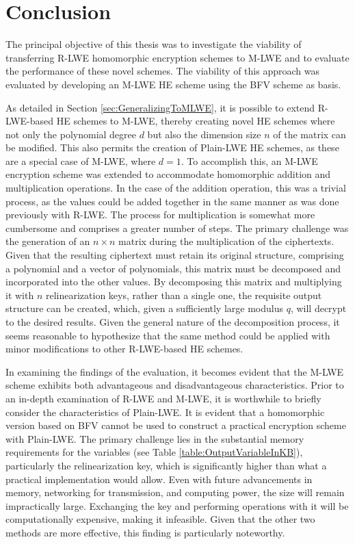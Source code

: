 \chapter{Conclusion}

The principal objective of this thesis was to investigate the viability of transferring R-LWE homomorphic encryption schemes to M-LWE and to evaluate the performance of these novel schemes. The viability of this approach was evaluated by developing an M-LWE HE scheme using the BFV scheme \cite{bfv} as basis.
 
As detailed in Section \ref{sec:GeneralizingToMLWE}, it is possible to extend R-LWE-based HE schemes to M-LWE, thereby creating novel HE schemes where not only the polynomial degree $d$ but also the dimension size $n$ of the matrix can be modified. This also permits the creation of Plain-LWE HE schemes, as these are a special case of M-LWE, where $d=1$. To accomplish this, an M-LWE encryption scheme was extended to accommodate homomorphic  addition and multiplication operations. In the case of the addition operation, this was a trivial process, as the values could be added together in the same manner as was done previously with R-LWE. The process for multiplication is somewhat more cumbersome and comprises a greater number of steps. The primary challenge was the generation of an $n \times n$ matrix during the multiplication of the ciphertexts. Given that the resulting ciphertext must retain its original structure, comprising a polynomial and a vector of polynomials, this matrix must be decomposed and incorporated into the other values. By decomposing this matrix and multiplying it with $n$ relinearization keys, rather than a single one, the requisite output structure can be created, which, given a sufficiently large modulus $q$, will decrypt to the desired results. Given the general nature of the decomposition process, it seems reasonable to hypothesize that the same method could be applied with minor modifications to other R-LWE-based HE schemes.


In examining the findings of the evaluation, it becomes evident that the M-LWE scheme exhibits both advantageous and disadvantageous characteristics. Prior to an in-depth examination of R-LWE and M-LWE, it is worthwhile to briefly consider the characteristics of Plain-LWE. It is evident that a homomorphic version based on BFV cannot be used to construct a practical encryption scheme with Plain-LWE. The primary challenge lies in the substantial memory requirements for the variables (see Table \ref{table:OutputVariableInKB}), particularly the relinearization key, which is significantly higher than what a practical implementation would allow. Even with future advancements in memory, networking for transmission, and computing power, the size will remain impractically large. Exchanging the key and performing operations with it will be computationally expensive, making it infeasible. Given that the other two methods are more effective, this finding is particularly noteworthy.

